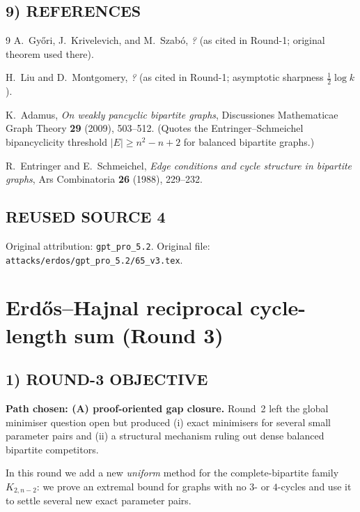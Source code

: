 \subsection*{9) \textbf{REFERENCES}}
\begin{thebibliography}{9}
A.~Gy\H{o}ri, J.~Krivelevich, and M.~Szab\'{o}, \emph{?} (as cited in Round-1; original theorem used there).

H.~Liu and D.~Montgomery, \emph{?} (as cited in Round-1; asymptotic sharpness $\tfrac12\log k$).

K.~Adamus, \emph{On weakly pancyclic bipartite graphs}, Discussiones Mathematicae Graph Theory \textbf{29} (2009), 503--512.
(Quotes the Entringer--Schmeichel bipancyclicity threshold $|E|\ge n^2-n+2$ for balanced bipartite graphs.)

R.~Entringer and E.~Schmeichel, \emph{Edge conditions and cycle structure in bipartite graphs}, Ars Combinatoria \textbf{26} (1988), 229--232.
\end{thebibliography}


\subsection*{REUSED SOURCE 4}
Original attribution: \texttt{gpt\_pro\_5.2}.
Original file: \texttt{attacks/erdos/gpt\_pro\_5.2/65\_v3.tex}.

\section{Erd\H{o}s--Hajnal reciprocal cycle-length sum (Round 3)}

\subsection{1) ROUND-3 OBJECTIVE}

\textbf{Path chosen: (A) proof-oriented gap closure.}
Round~2 left the global minimiser question open but produced
(i) exact minimisers for several small parameter pairs and
(ii) a structural mechanism ruling out dense balanced bipartite competitors.

In this round we add a new \emph{uniform} method for the complete-bipartite family
$K_{2,n-2}$: we prove an extremal bound for graphs with no $3$- or $4$-cycles and
use it to settle several new exact parameter pairs.

